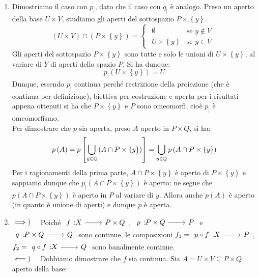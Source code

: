 \begin{demonstration}
\begin{enumerate}[label=\Roman*]
\begin{enumerate}[label=(\alph*)]
\end{enumerate}
\item Dimostriamo il caso con $p_{\mid}$, dato che il caso con $q_{\mid}$ è analogo. Preso un aperto della base $U\times V$, studiamo gli aperti del sottospazio $P\times\left\{ y\right\}$.
\begin{equation*}
\left(U\times V\right)\cap \left(P\times\left\{ y\right\}\right)=\begin{cases}
	\begin{array}{ll}
		\emptyset & \text{se }y\notin V\\
		U\times\left\{y\right\} &\text{se }y\in V
	\end{array}

\end{cases}
\end{equation*}
Gli aperti del sottospazio $P\times\left\{ y\right\}$ sono tutte e solo le unioni di $U\times\left\{ y\right\}$, al variare di $Y$ di aperti dello spazio $P$. Si ha dunque:
\begin{equation*}
p_{\mid}\left(U\times \left\{y\right\}\right)=U
\end{equation*}
Dunque, essendo $p_{\mid}$ continua perché restrizione della proiezione (che è continua per definizione), biettiva per costruzione e aperta per i risultati appena ottenuti si ha che $P\times\left\{ y\right\}$ e $P$ sono omeomorfi, cioè $p_{\mid}$ è omeomorfismo.\\
Per dimostrare che $p$ sia aperta, preso $A$ aperto in $P\times Q$, si ha:
\begin{equation}
p\left(A\right)=p\left[\mathop{{\bigcup}}\displaylimits_{y\in\mathbb{Q}}\left(A\cap P\times\left\{ y\right\}\right)\right]=\mathop{{\bigcup}}\displaylimits_{y\in\mathbb{Q}}p\left(A\cap P\times\left\{ y\right\}\right)
\end{equation}
Per i ragionamenti della prima parte, $A\cap P\times\left\{ y\right\}$ è aperto di $P\times\left\{ y\right\}$ e sappiamo dunque che $p_{\mid}\left(A\cap P\times\left\{ y\right\}\right)$ è aperto: ne segue che $p\left(A\cap P\times\left\{ y\right\}\right)$ è aperto in $P$ al variare di $y$. Allora anche $p\left(A\right)$ è aperto (in quanto è unione di aperti) e dunque $p$ è aperta.
\item $\implies)\quad$ Poiché $\funz{f}{X}{P\times Q}$, $\funz{p}{P\times Q}{P}$ e $\funz{q}{P\times Q}{Q}$ sono continue, le composizioni $f_1=\funz{p\circ f}{X}{P}$, $f_2=\funz{q\circ f}{X}{Q}$ sono banalmente continue.\\
$\impliedby)\quad$ Dobbiamo dimostrare che $f$ sia continua. Sia $A=U\times V\subseteq P\times Q$ aperto della base:

\end{enumerate}
\end{demonstration}
